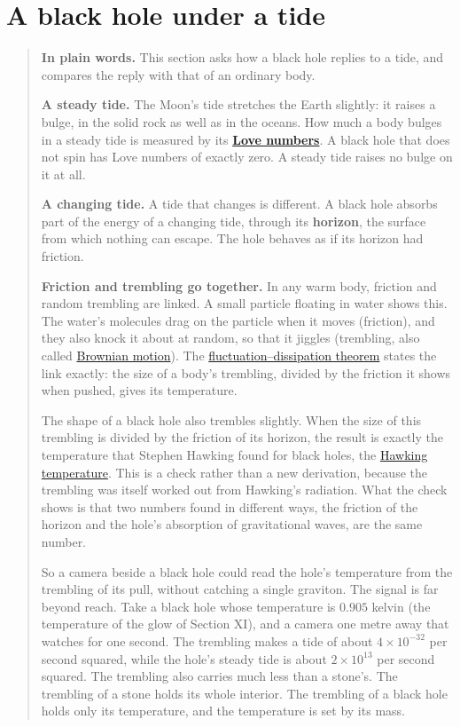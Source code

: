\section{A black hole under a tide}\label{sec:hole}

\begin{quote}
\textbf{In plain words.} This section asks how a black hole replies to a tide,
and compares the reply with that of an ordinary body.

\textbf{A steady tide.} The Moon's tide stretches the Earth slightly: it raises
a bulge, in the solid rock as well as in the oceans. How much a body bulges in a
steady tide is measured by its
\textbf{\href{https://en.wikipedia.org/wiki/Love_number}{Love numbers}}. A black
hole that does not spin has Love numbers of exactly zero. A steady tide raises
no bulge on it at all.

\textbf{A changing tide.} A tide that changes is different. A black hole absorbs
part of the energy of a changing tide, through its \textbf{horizon}, the surface
from which nothing can escape. The hole behaves as if its horizon had friction.

\textbf{Friction and trembling go together.} In any warm body, friction and
random trembling are linked. A small particle floating in water shows this. The
water's molecules drag on the particle when it moves (friction), and they also
knock it about at random, so that it jiggles (trembling, also called
\href{https://en.wikipedia.org/wiki/Brownian_motion}{Brownian motion}). The
\href{https://en.wikipedia.org/wiki/Fluctuation-dissipation_theorem}{fluctuation--dissipation
theorem} states the link exactly: the size of a body's trembling, divided by the
friction it shows when pushed, gives its temperature.

The shape of a black hole also trembles slightly. When the size of this
trembling is divided by the friction of its horizon, the result is exactly the
temperature that Stephen Hawking found for black holes, the
\href{https://en.wikipedia.org/wiki/Hawking_radiation}{Hawking temperature}.
This is a check rather than a new derivation, because the trembling was itself
worked out from Hawking's radiation. What the check shows is that two numbers
found in different ways, the friction of the horizon and the hole's absorption
of gravitational waves, are the same number.

So a camera beside a black hole could read the hole's temperature from the
trembling of its pull, without catching a single graviton. The signal is far
beyond reach. Take a black hole whose temperature is $0.905$ kelvin (the
temperature of the glow of Section XI), and a camera one metre away that
watches for one second. The trembling makes a tide of about
$4\times10^{-32}$ per second squared, while the hole's steady tide is about
$2\times10^{13}$ per second squared. The trembling also carries much less than
a stone's. The trembling of a stone holds its whole interior. The trembling of
a black hole holds only its temperature, and the temperature is set by its mass.


\end{quote}

